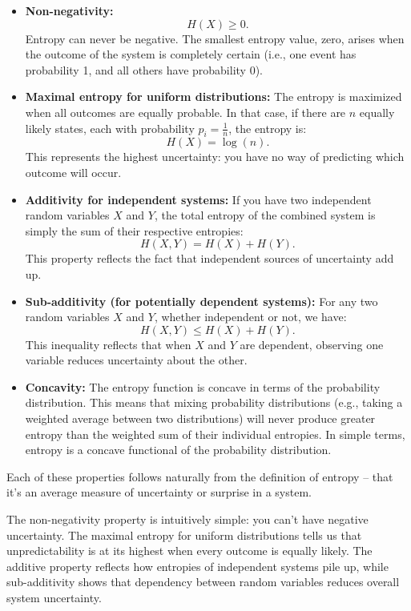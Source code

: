 \documentclass[12pt,a4paper]{article}
\newenvironment{rembox}[1][]{%
  \begin{tcolorbox}[enhanced, breakable, colback=gray!5, colframe=gray!50, title=#1, fonttitle=\bfseries, arc=3pt, boxrule=0.5pt]
}{\end{tcolorbox}}
\begin{document}
\begin{itemize}
    \item \textbf{Non-negativity:} 
    \[
    H(X) \geq 0.
    \]
    Entropy can never be negative. The smallest entropy value, zero, arises when the outcome of the system is completely certain (i.e., one event has probability 1, and all others have probability 0).

    \item \textbf{Maximal entropy for uniform distributions:} The entropy is maximized when all outcomes are equally probable. In that case, if there are $n$ equally likely states, each with probability $p_i = \frac{1}{n}$, the entropy is:
    \[
    H(X) = \log(n).
    \]
    This represents the highest uncertainty: you have no way of predicting which outcome will occur.

    \item \textbf{Additivity for independent systems:} If you have two independent random variables $X$ and $Y$, the total entropy of the combined system is simply the sum of their respective entropies:
    \[
    H(X, Y) = H(X) + H(Y).
    \]
    This property reflects the fact that independent sources of uncertainty add up.

    \item \textbf{Sub-additivity (for potentially dependent systems):}
    For any two random variables $X$ and $Y$, whether independent or not, we have:
    \[
    H(X, Y) \leq H(X) + H(Y).
    \]
    This inequality reflects that when $X$ and $Y$ are dependent, observing one variable reduces uncertainty about the other.

    \item \textbf{Concavity:} The entropy function is concave in terms of the probability distribution. This means that mixing probability distributions (e.g., taking a weighted average between two distributions) will never produce greater entropy than the weighted sum of their individual entropies. In simple terms, entropy is a concave functional of the probability distribution.
\end{itemize}

Each of these properties follows naturally from the definition of entropy – that it’s an average measure of uncertainty or surprise in a system. 

\begin{rembox}[Intuition Behind Properties]
    The non-negativity property is intuitively simple: you can't have negative uncertainty. The maximal entropy for uniform distributions tells us that unpredictability is at its highest when every outcome is equally likely. The additive property reflects how entropies of independent systems pile up, while sub-additivity shows that dependency between random variables reduces overall system uncertainty.
\end{rembox}
\end{document}
